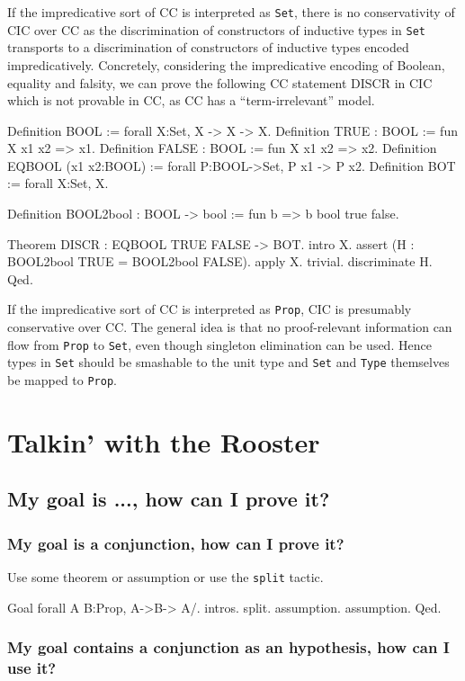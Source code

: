 \documentclass[a4paper,pdftex]{article}
\def\Question#1{\stepcounter{question}\subsubsection{#1}}
\def\split{{\tt split}}
\def\Type{{\tt Type}}
\def\Prop{{\tt Prop}}
\def\Set{{\tt Set}}
\begin{document}
If the impredicative sort of CC is interpreted as {\Set}, there is no
conservativity of CIC over CC as the discrimination of
constructors of inductive types in {\Set} transports to a
discrimination of constructors of inductive types encoded
impredicatively. Concretely, considering the impredicative encoding of
Boolean, equality and falsity, we can prove the following CC statement
DISCR in CIC which is not provable in CC, as CC has a
``term-irrelevant'' model.

\begin{coq_example*}
Definition BOOL := forall X:Set, X -> X -> X.
Definition TRUE : BOOL := fun X x1 x2 => x1.
Definition FALSE : BOOL := fun X x1 x2 => x2.
Definition EQBOOL (x1 x2:BOOL) := forall P:BOOL->Set, P x1 -> P x2.
Definition BOT := forall X:Set, X.

Definition BOOL2bool : BOOL -> bool := fun b => b bool true false.

Theorem DISCR : EQBOOL TRUE FALSE -> BOT.
intro X.
assert (H : BOOL2bool TRUE = BOOL2bool FALSE).
{ apply X. trivial. }
discriminate H.
Qed.
\end{coq_example*}

If the impredicative sort of CC is interpreted as {\Prop}, CIC is
presumably conservative over CC. The general idea is that no
proof-relevant information can flow from {\Prop} to {\Set}, even
though singleton elimination can be used. Hence types in {\Set} should
be smashable to the unit type and {\Set} and {\Type} themselves be
mapped to {\Prop}.

\section{Talkin' with the Rooster}


\subsection{My goal is ...,  how can I prove it?}


\Question{My goal is a conjunction, how can I prove it?}

Use some theorem or assumption or use the {\split} tactic.
\begin{coq_example}
Goal forall A B:Prop, A->B-> A/\B.
intros.
split.
assumption.
assumption.
Qed.
\end{coq_example}

\Question{My goal contains a conjunction as an hypothesis, how can I use it?}
\end{document}
